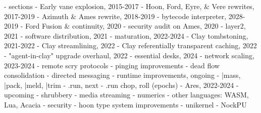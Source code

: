 \documentclass[twoside]{article}
\begin{document}
- sections
  - Early vane explosion, 2015-2017
  - Hoon, Ford, Eyre, \& Vere rewrites, 2017-2019
  - Azimuth \& Ames rewrite, 2018-2019
  - bytecode interpreter, 2028-2019
  - Ford Fusion \& continuity, 2020
  - security audit on Ames, 2020
  - layer2, 2021
  - software distribution, 2021
    - maturation, 2022-2024
      - Clay tombstoning, 2021-2022
      - Clay streamlining, 2022
      - Clay referentially transparent caching, 2022
      - "agent-in-clay" upgrade overhaul, 2022
      - essential desks, 2024
  - network scaling, 2023-2024
    - remote scry protocols
    - pinging improvements
    - dead flow consolidation
    - directed messaging
  - runtime improvements, ongoing
    - |mass, |pack, |meld, |trim
    - .run, next
    - .run chop, roll (epochs)
  - Ares, 2022-2024
  - upcoming
    - shrubbery
    - media streaming
    - numerics
    - other languages: WASM, Lua, Acacia
    - security
    - hoon type system improvements
    - unikernel
    - NockPU

\printbibliography
\end{document}
